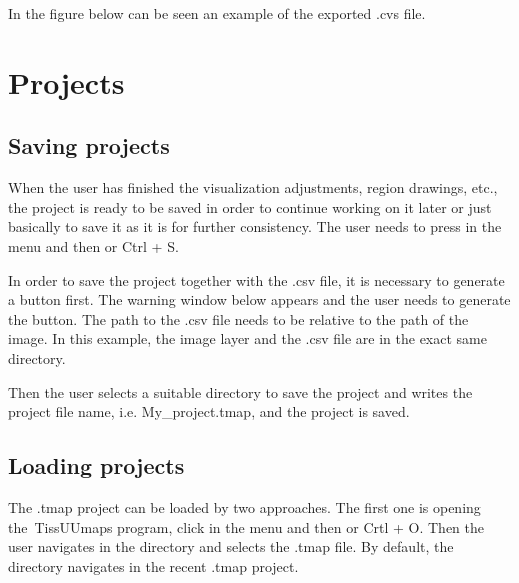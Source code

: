 \documentclass[letterpaper,10pt,english,openany,oneside]{sphinxmanual}
\begin{document}
\sphinxAtStartPar
{}

\sphinxAtStartPar
In the figure below can be seen an example of the exported .cvs file.

\sphinxAtStartPar
{}

\sphinxstepscope


\section{Projects}
\label{\detokenize{docs/starting/projects:projects}}\label{\detokenize{docs/starting/projects::doc}}

\subsection{Saving projects}
\label{\detokenize{docs/starting/projects:saving-projects}}
\sphinxAtStartPar
When the user has finished the visualization adjustments, region drawings, etc., the project is ready to be saved in order to continue working on it later or just basically to save it as it is for further consistency. The user needs to press  in the menu and then  or Ctrl + S.

\sphinxAtStartPar
{}

\sphinxAtStartPar
In order to save the project together with the .csv file, it is necessary to generate a button first. The warning window below appears and the user needs to generate the button. The path to the .csv file needs to be relative to the path of the image. In this example, the image layer and the .csv file are in the exact same directory.

\sphinxAtStartPar
{}

\sphinxAtStartPar
Then the user selects a suitable directory to save the project and writes the project file name, i.e. My\_project.tmap, and the project is saved.

\sphinxAtStartPar
{}


\subsection{Loading projects}
\label{\detokenize{docs/starting/projects:loading-projects}}
\sphinxAtStartPar
The .tmap project can be loaded by two approaches. The first one is opening the TissUUmaps program, click  in the menu and then  or Crtl + O. Then the user navigates in the directory and selects the .tmap file. By default, the directory navigates in the recent .tmap project.
\end{document}
